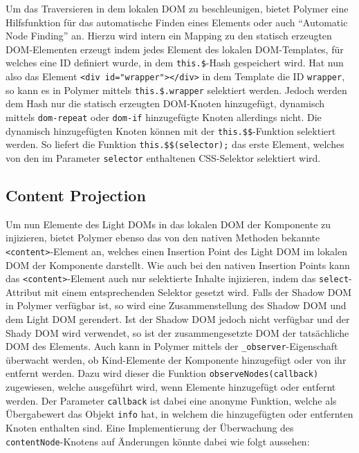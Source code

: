 Um das Traversieren in dem lokalen DOM zu beschleunigen, bietet Polymer
eine Hilfsfunktion für das automatische Finden eines Elements oder auch
``Automatic Node Finding'' an. Hierzu wird intern ein Mapping zu den
statisch erzeugten DOM-Elementen erzeugt indem jedes Element des lokalen
DOM-Templates, für welches eine ID definiert wurde, in dem
\texttt{this.\$}-Hash gespeichert wird. Hat nun also das Element
\texttt{\textless{}div\ id="wrapper"\textgreater{}\textless{}/div\textgreater{}}
in dem Template die ID \texttt{wrapper}, so kann es in Polymer mittels
\texttt{this.\$.wrapper} selektiert werden. Jedoch werden dem Hash nur
die statisch erzeugten DOM-Knoten hinzugefügt, dynamisch mittels
\texttt{dom-repeat} oder \texttt{dom-if} hinzugefügte Knoten allerdings
nicht. Die dynamisch hinzugefügten Knoten können mit der
\texttt{this.\$\$}-Funktion selektiert werden. So liefert die Funktion
\texttt{this.\$\$(selector);} das erste Element, welches von den im
Parameter \texttt{selector} enthaltenen CSS-Selektor selektiert wird.

\subsection{Content Projection}\label{content-projection}

Um nun Elemente des Light DOMs in das lokalen DOM der Komponente zu
injizieren, bietet Polymer ebenso das von den nativen Methoden bekannte
\texttt{\textless{}content\textgreater{}}-Element an, welches einen
Insertion Point des Light DOM im lokalen DOM der Komponente darstellt.
Wie auch bei den nativen Insertion Points kann das
\texttt{\textless{}content\textgreater{}}-Element auch nur selektierte
Inhalte injizieren, indem das \texttt{select}-Attribut mit einem
entsprechenden Selektor gesetzt wird. Falls der Shadow DOM in Polymer
verfügbar ist, so wird eine Zusammenstellung des Shadow DOM und dem
Light DOM gerendert. Ist der Shadow DOM jedoch nicht verfügbar und der
Shady DOM wird verwendet, so ist der zusammengesetzte DOM der
tatsächliche DOM des Elements. Auch kann in Polymer mittels der
\texttt{\_observer}-Eigenschaft überwacht werden, ob Kind-Elemente der
Komponente hinzugefügt oder von ihr entfernt werden. Dazu wird dieser
die Funktion \texttt{observeNodes(callback)} zugewiesen, welche
ausgeführt wird, wenn Elemente hinzugefügt oder entfernt werden. Der
Parameter \texttt{callback} ist dabei eine anonyme Funktion, welche als
Übergabewert das Objekt \texttt{info} hat, in welchem die hinzugefügten
oder entfernten Knoten enthalten sind. Eine Implementierung der
Überwachung des \texttt{contentNode}-Knotens auf Änderungen könnte dabei
wie folgt aussehen:

